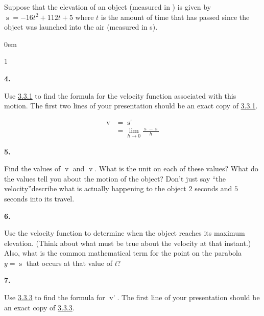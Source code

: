 \documentclass[12pt,]{book}
\theoremstyle{plain}
\theoremstyle{definition}
\numberwithin{equation}{section}
\newenvironment{exercisegroup}%
{\medskip\noindent}%
{\par\bigskip}%
\newlength{\exercisegroupindent}%
\newlength{\exercisegroupitemwidth}%
\newenvironment{exercisegrouplist}%
{\vspace{-\partopsep}%
\begin{adjustwidth}{\exercisegroupindent}{0em}}%
{\end{adjustwidth}%
\vspace{-\partopsep}%
\vspace{\baselineskip}}%
\newenvironment{exercisegroupbycol}[1]%
{\begin{exercisegrouplist}%
\vspace{-\multicolsep}%
\begin{multicols}{#1}%
\setlength{\parindent}{0em}%
\setlength{\exercisegroupitemwidth}{\linewidth}}%
{\end{multicols}%
\vspace{-\multicolsep}%
\end{exercisegrouplist}}%
\newenvironment{exercisegroupitem}[1]%
{\begin{minipage}[t]{\exercisegroupitemwidth}
\vspace{0pt}%
{\bfseries#1}%
\rule{0pt}{\baselineskip}}{\strut%
\end{minipage}%
\hspace{\columnsep}}%
\providecommand\phantomsection{}
\newcommand{\fe}[2]{\mathop{{#1}{\left(#2\right)}}}
\newcommand{\fd}[1]{#1'}
\begin{document}
\begin{exercisegroup}%
Suppose that the elevation of an object (measured in \si{\foot}) is given by \(\fe{s}{t}=-16t^2+112t+5\) where \(t\) is the amount of time that has passed since the object was launched into the air (measured in \si{\second}).%
\par
\begin{exercisegroupbycol}{1}%
\begin{exercisegroupitem}{4. }\phantomsection\hypertarget{exercise-188}{\null}
Use \hyperref[instantaneous-velocity-equation]{3.3.1} to find the formula for the velocity function associated with this motion. The first two lines of your presentation should be an exact copy of \hyperref[instantaneous-velocity-equation]{3.3.1}.%
\par
\begin{align}
\fe{v}{t}&=\fe{\fd{s}}{t}\label{instantaneous-velocity-equation}\\
&=\lim_{h\to0}\frac{\fe{s}{t+h}-\fe{s}{t}}{h}\label{mrow-222}
\end{align}%
\end{exercisegroupitem}%
\par%
\begin{exercisegroupitem}{5. }\phantomsection\hypertarget{exercise-189}{\null}
Find the values of \(\fe{v}{2}\) and \(\fe{v}{5}\). What is the unit on each of these values? What do the values tell you about the motion of the object? Don't just say ``the velocity''\textemdash{}describe what is actually happening to the object \(2\) seconds and \(5\) seconds into its travel.%
\end{exercisegroupitem}%
\par%
\begin{exercisegroupitem}{6. }\phantomsection\hypertarget{exercise-190}{\null}
 Use the velocity function to determine when the object reaches its maximum elevation. (Think about what must be true about the velocity at that instant.) Also, what is the common mathematical term for the point on the parabola \(y=\fe{s}{t}\) that occurs at that value of \(t\)?%
\end{exercisegroupitem}%
\par%
\begin{exercisegroupitem}{7. }\phantomsection\hypertarget{exercise-191}{\null}
Use \hyperref[instantaneous-acceleration-equation]{3.3.3} to find the formula for \(\fe{\fd{v}}{t}\). The first line of your presentation should be an exact copy of \hyperref[instantaneous-acceleration-equation]{3.3.3}.%
\par

\end{exercisegroupitem}
\end{exercisegroupbycol}
\end{exercisegroup}
\end{document}
